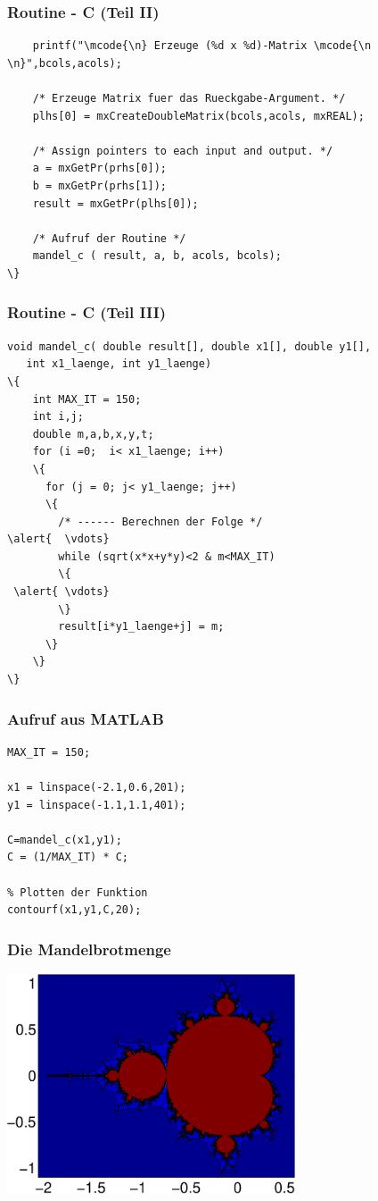 \begin{frame}[fragile]\frametitle{Routine - C (Teil II)}
\begin{lstlisting}   
    printf("\mcode{\n} Erzeuge (%d x %d)-Matrix \mcode{\n \n}",bcols,acols);
    
    /* Erzeuge Matrix fuer das Rueckgabe-Argument. */
    plhs[0] = mxCreateDoubleMatrix(bcols,acols, mxREAL);

    /* Assign pointers to each input and output. */
    a = mxGetPr(prhs[0]);
    b = mxGetPr(prhs[1]);
    result = mxGetPr(plhs[0]);

    /* Aufruf der Routine */
    mandel_c ( result, a, b, acols, bcols);
\}
\end{lstlisting}
\end{frame}
\begin{frame}[fragile]\frametitle{Routine - C (Teil III)}
\begin{lstlisting}
void mandel_c( double result[], double x1[], double y1[], 
   int x1_laenge, int y1_laenge)
\{
    int MAX_IT = 150;
    int i,j;
    double m,a,b,x,y,t;
    for (i =0;  i< x1_laenge; i++)
    \{
      for (j = 0; j< y1_laenge; j++)
      \{
        /* ------ Berechnen der Folge */        
\alert{  \vdots}
        while (sqrt(x*x+y*y)<2 & m<MAX_IT)
        \{
 \alert{ \vdots}
        \}
        result[i*y1_laenge+j] = m;
      \}
    \}
\}
\end{lstlisting}
\end{frame}
\begin{frame}[fragile]\frametitle{Aufruf aus MATLAB}
\begin{lstlisting}
MAX_IT = 150;

x1 = linspace(-2.1,0.6,201);
y1 = linspace(-1.1,1.1,401);

C=mandel_c(x1,y1);
C = (1/MAX_IT) * C;

% Plotten der Funktion
contourf(x1,y1,C,20);
\end{lstlisting}
\end{frame}
\begin{frame}[fragile]\frametitle{Die Mandelbrotmenge}
\includegraphics[width=\linewidth, height=6.5cm]{./figures/mandelbrot}
\end{frame}
%
%

